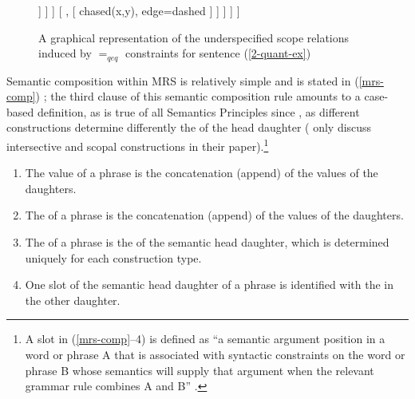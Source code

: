 \documentclass[output=paper
	        ,collection
	        ,collectionchapter
 	        ,biblatex
                ,babelshorthands
                ,newtxmath
                ,draftmode
                ,colorlinks, citecolor=brown
]{langscibook}
\begin{document}
\begin{figure}
\begin{forest}
[ top
[ {chased(x,y)}, edge=dashed
	[ every, no edge
		[ dog(x), edge=dashed ]
		[ {}, no edge 
				[ some(y), no edge 
					[ cat (y), edge=dashed ] 
					[ {}, [ {chased(x,y)}, edge=dashed	 ] ] ] ] 
		[ {}, [ {chased(x,y)}, edge=dashed ] ]			
					] 
	]
	]
\end{forest}
\caption{\label{fig:MRS-tree}A graphical representation of the underspecified scope relations induced by $=_{qeq}$ constraints for sentence (\ref{2-quant-ex})}
\end{figure}

Semantic composition within MRS is relatively simple and is stated in (\ref{mrs-comp}) \citep[313--314]{Copestakeetal2005}; the third clause of this semantic composition rule amounts to a case-based definition, as is true of all Semantics Principles  since \citet{PollardandSag1987}, as different constructions determine differently the  of the head daughter (\citealt{Copestakeetal2005} only discuss intersective and scopal constructions in their paper).\footnote{A slot in (\ref{mrs-comp}--4) is defined as ``a semantic argument position in a word or phrase A that is associated with syntactic constraints on the word or phrase B whose semantics will supply that argument when the relevant grammar rule combines A and B'' \citep[313]{Copestakeetal2005}.}

\begin{exe}
\ex\label{mrs-comp}
\begin{enumerate}
\item The  value of a phrase is the concatenation (append) of the 
values of the daughters.
\item The  of a phrase is the concatenation (append) of the  values of the daughters.
\item The  of a phrase is the  of the semantic head daughter, which is determined uniquely for each construction type.
\item One slot of the semantic head daughter of a phrase is identified with the  in the other daughter. 
\end{enumerate}
\end{exe}
\end{document}

